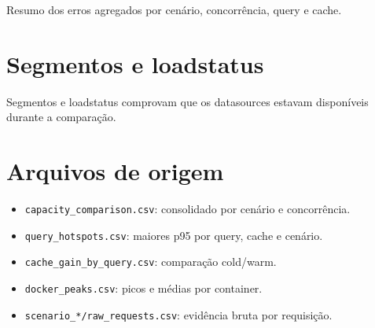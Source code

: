 \documentclass[11pt,a4paper]{article}
\begin{document}
Resumo dos erros agregados por cenário, concorrência, query e cache.



\section{Segmentos e loadstatus}

Segmentos e loadstatus comprovam que os datasources estavam disponíveis durante a comparação.





\section{Arquivos de origem}

\begin{itemize}

\item \texttt{capacity\_comparison.csv}: consolidado por cenário e concorrência.

\item \texttt{query\_hotspots.csv}: maiores p95 por query, cache e cenário.

\item \texttt{cache\_gain\_by\_query.csv}: comparação cold/warm.

\item \texttt{docker\_peaks.csv}: picos e médias por container.

\item \texttt{scenario\_*/raw\_requests.csv}: evidência bruta por requisição.

\end{itemize}
\end{document}
